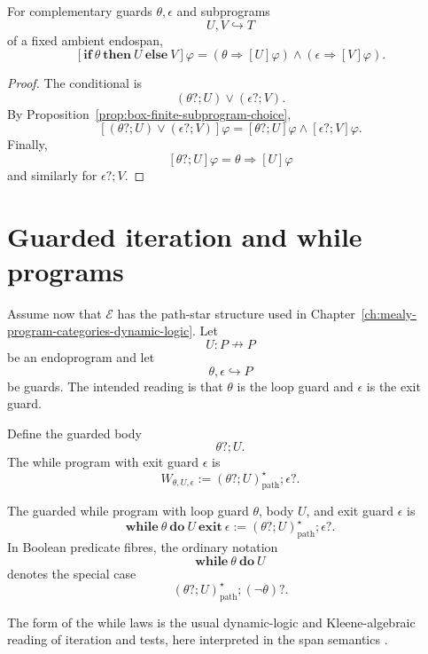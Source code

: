\begin{proposition}
\label{prop:box-law-guarded-conditionals}
For complementary guards \(\theta,\epsilon\) and subprograms
\[
U,V\hookrightarrow T
\]
of a fixed ambient endospan,
\[
\left[
\mathbf{if}\ \theta\ \mathbf{then}\ U\ \mathbf{else}\ V
\right]\varphi
=
(\theta\Rightarrow[U]\varphi)
\wedge
(\epsilon\Rightarrow[V]\varphi).
\]
\end{proposition}

\begin{proof}
The conditional is
\[
(\theta?;U)\vee(\epsilon?;V).
\]
By Proposition~\ref{prop:box-finite-subprogram-choice},
\[
\left[
(\theta?;U)\vee(\epsilon?;V)
\right]\varphi
=
[\theta?;U]\varphi
\wedge
[\epsilon?;V]\varphi.
\]
Finally,
\[
[\theta?;U]\varphi
=
\theta\Rightarrow[U]\varphi
\]
and similarly for \(\epsilon?;V\).
\end{proof}

\section{Guarded iteration and while programs}
\label{sec:guarded-iteration-while-programs}

Assume now that \(\mathcal E\) has the path-star structure used in
Chapter~\ref{ch:mealy-program-categories-dynamic-logic}. Let
\[
U:P\nrightarrow P
\]
be an endoprogram and let
\[
\theta,\epsilon\hookrightarrow P
\]
be guards. The intended reading is that \(\theta\) is the loop guard and
\(\epsilon\) is the exit guard.

Define the guarded body
\[
\theta?;U.
\]
The while program with exit guard \(\epsilon\) is
\[
W_{\theta,U,\epsilon}
:=
(\theta?;U)^\star_{\mathrm{path}};\epsilon?.
\]

\begin{definition}
\label{def:guarded-while-program}
The guarded while program with loop guard \(\theta\), body \(U\), and exit
guard \(\epsilon\) is
\[
\mathbf{while}\ \theta\ \mathbf{do}\ U\ \mathbf{exit}\ \epsilon
:=
(\theta?;U)^\star_{\mathrm{path}};\epsilon?.
\]
In Boolean predicate fibres, the ordinary notation
\[
\mathbf{while}\ \theta\ \mathbf{do}\ U
\]
denotes the special case
\[
(\theta?;U)^\star_{\mathrm{path}};(\neg\theta)?.
\]
\end{definition}

The form of the while laws is the usual dynamic-logic and
Kleene-algebraic reading of iteration and tests, here interpreted in the
span semantics \cite{HarelKozenTiurynDynamicLogic,KozenKAT}.

